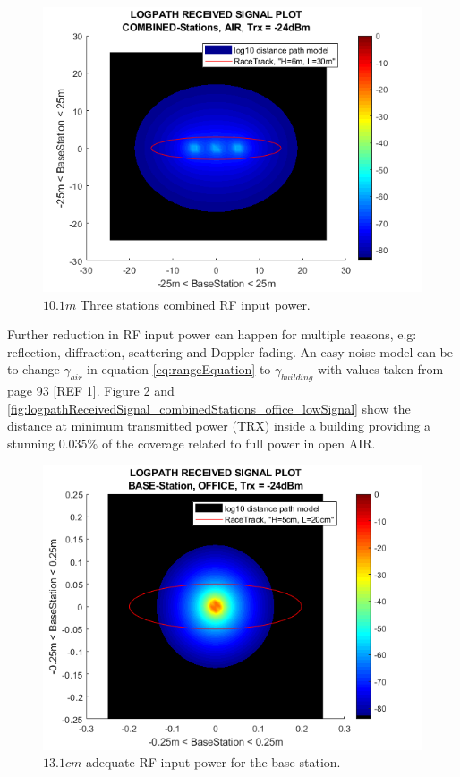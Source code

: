 \begin{figure}[h]
	\centering
	\includegraphics[width=1\linewidth]{theory/pathLoss/fig/logpathReceivedSignal_combinedStations_air_lowSignal.png}
	\caption{$10.1m$ Three stations combined RF input power.}
	\label{fig:logpathReceivedSignal_combinedStations_air_lowSignal}
\end{figure}

\noindent Further reduction in RF input power can happen for multiple reasons, e.g: reflection, diffraction, scattering and Doppler fading. An easy noise model can be to change $\gamma_{air}$ in equation \ref{eq:rangeEquation} to $\gamma_{building}$ with values taken from page 93 [REF 1]. Figure \ref{fig:logpathReceivedSignal_baseStation_office_lowSignal} and \ref{fig:logpathReceivedSignal_combinedStations_office_lowSignal} show the distance at minimum transmitted power (TRX) inside a building providing a stunning $0.035\%$ of the coverage related to full power in open AIR.

\begin{figure}[h]
	\centering
	\includegraphics[width=1\linewidth]{theory/pathLoss/fig/logpathReceivedSignal_baseStation_office_lowSignal.png}
	\caption{$13.1cm$ adequate RF input power for the base station.}
	\label{fig:logpathReceivedSignal_baseStation_office_lowSignal}
\end{figure}

